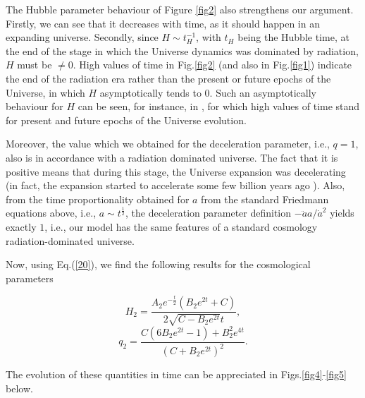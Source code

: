 The Hubble parameter behaviour of Figure \ref{fig2} also strengthens our
argument. Firstly, we can see that it decreases with time, as it should happen in an expanding
universe. Secondly, since $H\sim t_H^{-1}$, with $t_H$ being the Hubble
time, at the end of the stage in which the Universe dynamics was dominated
by radiation, $H$ must be $\neq0$. High values of time in Fig.\ref{fig2}
(and also in Fig.\ref{fig1}) indicate the end of the radiation era rather
than the present or future epochs of the Universe, in which $H$
asymptotically tends to $0$. Such an asymptotically behaviour for $H$ can be
seen, for instance, in \cite{ms/2016,moraes/2014}, for which high values of
time stand for present and future epochs of the Universe evolution.

Moreover, the value which we obtained for the deceleration parameter, i.e., $%
q=1$, also is in accordance with a radiation dominated universe. The fact
that it is positive means that during this stage, the Universe expansion was
decelerating (in fact, the expansion started to accelerate some few billion
years ago \cite{hinshaw/2013}). Also, from the time proportionality obtained
for $a$ from the standard Friedmann equations above, i.e., $a\sim t^{\frac{1%
}{2}}$, the deceleration parameter definition $-\ddot{a}a/\dot{a}^{2}$
yields exactly $1$, i.e., our model has the same features of a standard
cosmology radiation-dominated universe.

Now, using Eq.(\ref{20}), we find the following results for the cosmological parameters

\begin{equation} \label{22}
H_2=\frac{A_{2}e^{-\frac{t}{2}}(B_{2}e^{2t}+C)}{2\sqrt{C-B_{2}e^{2t}}t},
\end{equation}
\begin{equation} \label{23}
q_2=\frac{C(6B_{2}e^{2t}-1)+B_{2}^{2}e^{4t}}{(C+B_{2}e^{2t})^{2}}.
\end{equation}

The evolution of these quantities in time can be appreciated in Figs.\ref{fig4}-\ref{fig5} below.


